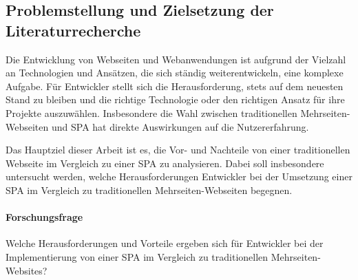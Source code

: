\subsection{Problemstellung und Zielsetzung der Literaturrecherche}

Die Entwicklung von Webseiten und Webanwendungen ist aufgrund der Vielzahl an Technologien und Ansätzen, die sich ständig weiterentwickeln, eine komplexe Aufgabe. 
Für Entwickler stellt sich die Herausforderung, stets auf dem neuesten Stand zu bleiben und die richtige Technologie oder den richtigen Ansatz für ihre Projekte auszuwählen. 
Insbesondere die Wahl zwischen traditionellen Mehrseiten-Webseiten und \ac{SPA} hat direkte Auswirkungen auf die Nutzererfahrung.

Das Hauptziel dieser Arbeit ist es, die Vor- und Nachteile von einer traditionellen Webseite im Vergleich zu einer \ac{SPA} zu analysieren. 
Dabei soll insbesondere untersucht werden, welche Herausforderungen Entwickler bei der Umsetzung einer \ac{SPA} im Vergleich zu traditionellen Mehrseiten-Webseiten begegnen.

\paragraph*{Forschungsfrage}
Welche Herausforderungen und Vorteile ergeben sich für Entwickler bei der Implementierung von einer \ac{SPA} im Vergleich zu traditionellen Mehrseiten-Websites?

